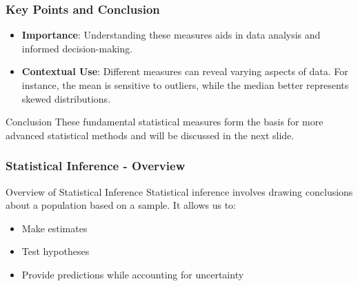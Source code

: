 \documentclass[aspectratio=169]{beamer}
\begin{document}
\begin{frame}[fragile]
    \frametitle{Key Points and Conclusion}
    \begin{itemize}
        \item \textbf{Importance}: Understanding these measures aids in data analysis and informed decision-making.
        \item \textbf{Contextual Use}: Different measures can reveal varying aspects of data. For instance, the mean is sensitive to outliers, while the median better represents skewed distributions.
    \end{itemize}
    \begin{block}{Conclusion}
        These fundamental statistical measures form the basis for more advanced statistical methods and will be discussed in the next slide.
    \end{block}
\end{frame}

\begin{frame}[fragile]
    \frametitle{Statistical Inference - Overview}
    \begin{block}{Overview of Statistical Inference}
        Statistical inference involves drawing conclusions about a population based on a sample. It allows us to:
        \begin{itemize}
            \item Make estimates
            \item Test hypotheses
            \item Provide predictions while accounting for uncertainty
        \end{itemize}
    \end{block}
\end{frame}
\end{document}
